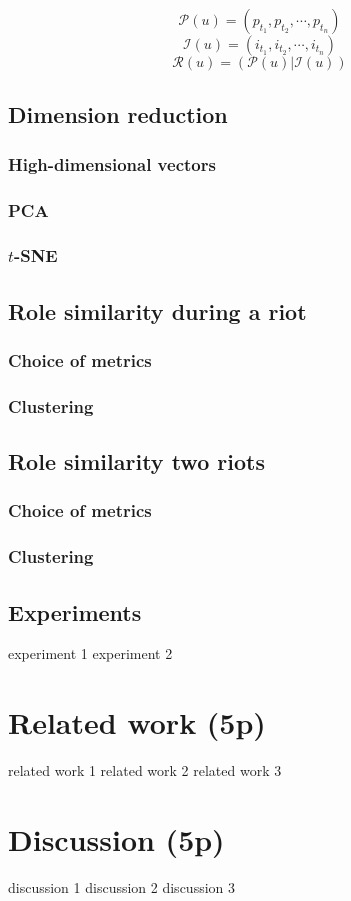 \documentclass[a4paper,12pt]{report}
\begin{document}
$$ \mathcal{P}(u) = (p_{t_1},p_{t_2},\cdots,p_{t_n}) $$
$$ \mathcal{I}(u) = (i_{t_1},i_{t_2},\cdots,i_{t_n}) $$
$$ \mathcal{R}(u) = (\mathcal{P}(u) | \mathcal{I}(u)) $$

\newpage

\section{Dimension reduction}
\subsection{High-dimensional vectors}
\subsection{PCA}
\subsection{$t$-SNE}



\newpage

\section{Role similarity during a riot}
\subsection{Choice of metrics}
\subsection{Clustering}

\newpage

\section{Role similarity two riots}
\subsection{Choice of metrics}
\subsection{Clustering}

\newpage

\section{Experiments}
experiment 1 \newpage
experiment 2 \newpage

\chapter{Related work (5p)}
related work 1 \newpage
related work 2 \newpage
related work 3 \newpage

\chapter{Discussion (5p) }
discussion 1 \newpage
discussion 2 \newpage
discussion 3 \newpage
\end{document}
